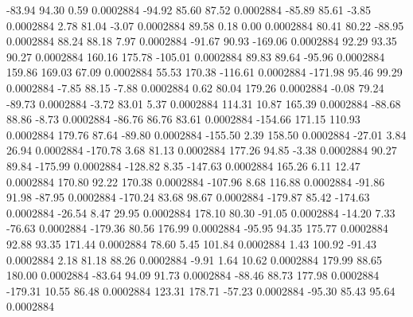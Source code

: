       -83.94       94.30        0.59     0.0002884
      -94.92       85.60       87.52     0.0002884
      -85.89       85.61       -3.85     0.0002884
        2.78       81.04       -3.07     0.0002884
       89.58        0.18        0.00     0.0002884
       80.41       80.22      -88.95     0.0002884
       88.24       88.18        7.97     0.0002884
      -91.67       90.93     -169.06     0.0002884
       92.29       93.35       90.27     0.0002884
      160.16      175.78     -105.01     0.0002884
       89.83       89.64      -95.96     0.0002884
      159.86      169.03       67.09     0.0002884
       55.53      170.38     -116.61     0.0002884
     -171.98       95.46       99.29     0.0002884
       -7.85       88.15       -7.88     0.0002884
        0.62       80.04      179.26     0.0002884
       -0.08       79.24      -89.73     0.0002884
       -3.72       83.01        5.37     0.0002884
      114.31       10.87      165.39     0.0002884
      -88.68       88.86       -8.73     0.0002884
      -86.76       86.76       83.61     0.0002884
     -154.66      171.15      110.93     0.0002884
      179.76       87.64      -89.80     0.0002884
     -155.50        2.39      158.50     0.0002884
      -27.01        3.84       26.94     0.0002884
     -170.78        3.68       81.13     0.0002884
      177.26       94.85       -3.38     0.0002884
       90.27       89.84     -175.99     0.0002884
     -128.82        8.35     -147.63     0.0002884
      165.26        6.11       12.47     0.0002884
      170.80       92.22      170.38     0.0002884
     -107.96        8.68      116.88     0.0002884
      -91.86       91.98      -87.95     0.0002884
     -170.24       83.68       98.67     0.0002884
     -179.87       85.42     -174.63     0.0002884
      -26.54        8.47       29.95     0.0002884
      178.10       80.30      -91.05     0.0002884
      -14.20        7.33      -76.63     0.0002884
     -179.36       80.56      176.99     0.0002884
      -95.95       94.35      175.77     0.0002884
       92.88       93.35      171.44     0.0002884
       78.60        5.45      101.84     0.0002884
        1.43      100.92      -91.43     0.0002884
        2.18       81.18       88.26     0.0002884
       -9.91        1.64       10.62     0.0002884
      179.99       88.65      180.00     0.0002884
      -83.64       94.09       91.73     0.0002884
      -88.46       88.73      177.98     0.0002884
     -179.31       10.55       86.48     0.0002884
      123.31      178.71      -57.23     0.0002884
      -95.30       85.43       95.64     0.0002884
